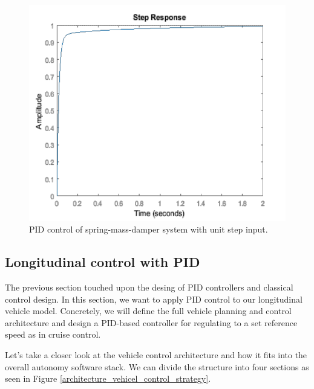 \begin{figure}[!htb]
\begin{center}
\includegraphics[scale=0.380]{img/longitudinal_control/full_pid_spring_mass_damper_system.jpeg}
\end{center}
\caption{PID control of  spring-mass-damper system with unit step input.}
\label{full_pid_spring_mass_damper_system}
\end{figure}

\subsection{Longitudinal control with PID}
\label{longitudinal_control_pid}

The previous section touched upon the desing of PID controllers and classical control design. In this section, we want to apply PID control to our longitudinal vehicle model. 
Concretely, we will define the full vehicle planning and control architecture and design a PID-based controller for regulating to a set reference speed as in cruise control. 

Let's take a closer look at the vehicle control architecture and how it fits into the overall autonomy software stack. 
We can divide the structure into four sections as seen in Figure \ref{architecture_vehicel_control_strategy}. 

